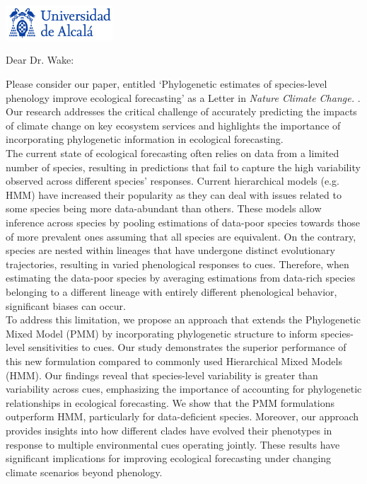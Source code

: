 \documentclass[11pt,a4paper]{letter}
\begin{document}
\begin{letter}{}
\includegraphics[width=0.3\textwidth]{logo_uah.png}

\opening{Dear Dr. Wake:}

\noindent Please consider our paper, entitled `Phylogenetic estimates of species-level phenology improve ecological forecasting' as a Letter in \emph{Nature Climate Change.} 
. Our research addresses the critical challenge of accurately predicting the impacts of climate change on key ecosystem services and highlights the importance of incorporating phylogenetic information in ecological forecasting.
\vspace{1.5ex}\\
The current state of ecological forecasting often relies on data from a limited number of species, resulting in predictions that fail to capture the high variability observed across different species' responses. Current hierarchical models (e.g. HMM) have increased their popularity as they can deal with issues related to some species being more data-abundant than others. These models allow inference across species by pooling estimations of data-poor species towards those of more prevalent ones assuming that all species are equivalent. On the contrary, species are nested within lineages that have undergone distinct evolutionary trajectories, resulting in varied phenological responses to cues. Therefore, when estimating the data-poor species by averaging estimations from data-rich species belonging to a different lineage with entirely different phenological behavior, significant biases can occur.
\vspace{1.5ex}\\
To address this limitation, we propose an approach that extends the Phylogenetic Mixed Model (PMM) by incorporating phylogenetic structure to inform species-level sensitivities to cues. Our study demonstrates the superior performance of this new formulation compared to commonly used Hierarchical Mixed Models (HMM). Our findings reveal that species-level variability is greater than variability across cues, emphasizing the importance of accounting for phylogenetic relationships in ecological forecasting. We show that the PMM formulations outperform HMM, particularly for data-deficient species. Moreover, our approach provides insights into how different clades have evolved their phenotypes in response to multiple environmental cues operating jointly. These results have significant implications for improving ecological forecasting under changing climate scenarios beyond phenology.

\end{letter}
\end{document}
